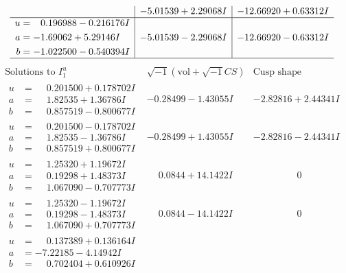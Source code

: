 \documentclass[1p]{elsarticle_modified}
\theoremstyle{definition}
\newcommand{\I}{\sqrt{-1}}
\begin{document}
$$\begin{array}{c|c|c}
 & -5.01539 + 2.29068 I & -12.66920 + 0.63312 I \\ \hline\begin{aligned}
u &= \phantom{-}0.196988 - 0.216176 I \\
a &= -1.69062 + 5.29146 I \\
b &= -1.022500 - 0.540394 I\end{aligned}
 & -5.01539 - 2.29068 I & -12.66920 - 0.63312 I\\
 \hline 
 \end{array}$$\newpage$$\begin{array}{c|c|c}  
\text{Solutions to }I^u_{1}& \I (\text{vol} + \sqrt{-1}CS) & \text{Cusp shape}\\
 \hline 
\begin{aligned}
u &= \phantom{-}0.201500 + 0.178702 I \\
a &= \phantom{-}1.82535 + 1.36786 I \\
b &= \phantom{-}0.857519 - 0.800677 I\end{aligned}
 & -0.28499 - 1.43055 I & -2.82816 + 2.44341 I \\ \hline\begin{aligned}
u &= \phantom{-}0.201500 - 0.178702 I \\
a &= \phantom{-}1.82535 - 1.36786 I \\
b &= \phantom{-}0.857519 + 0.800677 I\end{aligned}
 & -0.28499 + 1.43055 I & -2.82816 - 2.44341 I \\ \hline\begin{aligned}
u &= \phantom{-}1.25320 + 1.19672 I \\
a &= \phantom{-}0.19298 + 1.48373 I \\
b &= \phantom{-}1.067090 - 0.707773 I\end{aligned}
 & \phantom{-}0.0844 + 14.1422 I & \phantom{-0.000000 } 0 \\ \hline\begin{aligned}
u &= \phantom{-}1.25320 - 1.19672 I \\
a &= \phantom{-}0.19298 - 1.48373 I \\
b &= \phantom{-}1.067090 + 0.707773 I\end{aligned}
 & \phantom{-}0.0844 - 14.1422 I & \phantom{-0.000000 } 0 \\ \hline\begin{aligned}
u &= \phantom{-}0.137389 + 0.136164 I \\
a &= -7.22185 - 4.14942 I \\
b &= \phantom{-}0.702404 + 0.610926 I\end{aligned}

\end{array}$$
\end{document}
